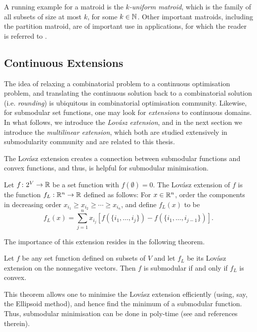 A running example for a matroid is the \emph{$k$-uniform matroid}, which is the family of all subsets of size at most $k$, for some $k\in\mathbb{N}$. Other important matroids, including the partition matroid, are of important use in applications, for which the reader is referred to \citet[Chapter II.2]{fujishige2005submodular}.


\subsection{Continuous Extensions}\label{sec:extensions}

The idea of relaxing a combinatorial problem to a continuous optimisation problem, and translating the continuous solution back to a combinatorial solution (i.e. \emph{rounding}) is ubiquitous in combinatorial optimisation community. Likewise, for submodular set functions, one may look for \emph{extensions} to continuous domains. In what follows, we introduce the \emph{Lov\'asz extension}, and in the next section we introduce the \emph{multilinear extension}, which both are studied extensively in submodularity community and are related to this thesis.

The Lov\'asz extension \citep{lovasz1983submodular} creates a connection between submodular functions and convex functions, and thus, is helpful for submodular minimisation. 

\begin{definition}
    Let $f\colon 2^V\to\mathbb{R}$ be a set function with $f(\emptyset) = 0$. The Lov\'asz extension of $f$ is the function $f_L:\mathbb{R}^n\to \mathbb{R}$ defined as follows: For $x\in\mathbb{R}^n$, order the components in decreasing order $x_{i_1} \geq x_{i_2} \geq \cdots \geq x_{i_n}$, and define $f_L(x)$ to be 
    \[
        f_L(x) = \sum_{j=1}^n x_{i_j}[f(\{i_1, \ldots, i_j\}) - f(\{i_1, \ldots, i_{j-1}\}) ].
    \]
\end{definition}
The importance of this extension resides in the following theorem.
\begin{theorem}
    Let $f$ be any set function defined on subsets of $V$ and let $f_L$ be its Lov\'asz extension on the nonnegative vectors. Then $f$ is submodular if and only if $f_L$ is convex.
\end{theorem}

This theorem allows one to minimise the Lov\'asz extension efficiently (using, say, the Ellipsoid method), and hence find the minimum of a submodular function. Thus, submodular minimisation can be done in poly-time (see \citet{fujishige2005submodular} and references therein).


